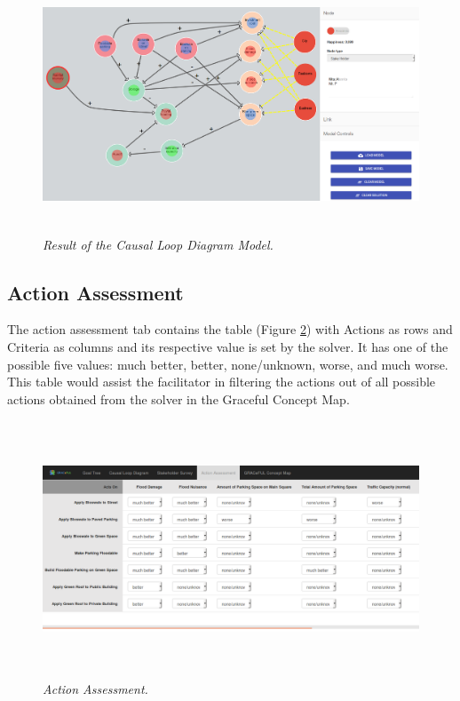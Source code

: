 \documentclass[a4paper]{article}
\begin{document}
\begin{figure}
\begin{center}
\includegraphics[height=3in,width=5in]{img/result.png}
\caption{\small \sl Result of the Causal Loop Diagram Model.\label{fig:result}}
\end{center}
\end{figure}

\subsection{Action Assessment}

The action assessment tab contains the table (Figure \ref{fig:assess}) with Actions as rows and Criteria as columns and its respective value is set by the solver. It has one of the possible five values: much better, better, none/unknown, worse, and much worse. This table would assist the facilitator in filtering the actions out of all possible actions obtained from the solver in the Graceful Concept Map.

\begin{figure}
\begin{center}
\includegraphics[width=6in, height=3in]{img/assess.png}
\caption{\small \sl Action Assessment.\label{fig:assess}}
\end{center}
\end{figure}
\end{document}
